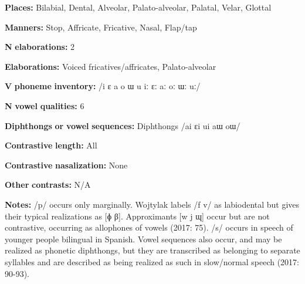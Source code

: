 \begin{styleBody}
\textbf{Places:} Bilabial, Dental, Alveolar, Palato-alveolar, Palatal, Velar, Glottal
\end{styleBody}

\begin{styleBody}
\textbf{Manners:} Stop, Affricate, Fricative, Nasal, Flap/tap
\end{styleBody}

\begin{styleBody}
\textbf{N} \textbf{elaborations:} 2
\end{styleBody}

\begin{styleBody}
\textbf{Elaborations:} Voiced fricatives/affricates, Palato-alveolar
\end{styleBody}

\begin{styleBody}
\textbf{V} \textbf{phoneme} \textbf{inventory:} /i ɛ a o ɯ u iː ɛː aː oː ɯː uː/
\end{styleBody}

\begin{styleBody}
\textbf{N} \textbf{vowel} \textbf{qualities:} 6
\end{styleBody}

\begin{styleBody}
\textbf{Diphthongs} \textbf{or} \textbf{vowel} \textbf{sequences:} Diphthongs /ai ɛi ui aɯ oɯ/
\end{styleBody}

\begin{styleBody}
\textbf{Contrastive} \textbf{length:} All
\end{styleBody}

\begin{styleBody}
\textbf{Contrastive} \textbf{nasalization:} None
\end{styleBody}

\begin{styleBody}
\textbf{Other} \textbf{contrasts:} N/A
\end{styleBody}

\begin{styleBody}
\textbf{Notes:} /p/ occurs only marginally. Wojtylak labels /f v/ as labiodental but gives their typical realizations as [ɸ β]. Approximants [w j ɰ] occur but are not contrastive, occurring as allophones of vowels (2017: 75). /s/ occurs in speech of younger people bilingual in Spanish. Vowel sequences also occur, and may be realized as phonetic diphthongs, but they are transcribed as belonging to separate syllables and are described as being realized as such in slow/normal speech (2017: 90-93).
\end{styleBody}

